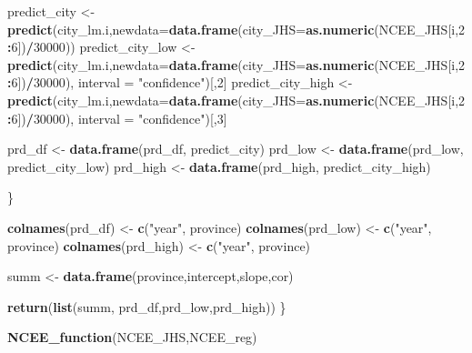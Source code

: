 \documentclass[]{article}
\newenvironment{Shaded}{\begin{snugshade}}{\end{snugshade}}
\newcommand{\KeywordTok}[1]{\textcolor[rgb]{0.13,0.29,0.53}{\textbf{#1}}}
\newcommand{\DataTypeTok}[1]{\textcolor[rgb]{0.13,0.29,0.53}{#1}}
\newcommand{\DecValTok}[1]{\textcolor[rgb]{0.00,0.00,0.81}{#1}}
\newcommand{\StringTok}[1]{\textcolor[rgb]{0.31,0.60,0.02}{#1}}
\newcommand{\OperatorTok}[1]{\textcolor[rgb]{0.81,0.36,0.00}{\textbf{#1}}}
\newcommand{\NormalTok}[1]{#1}
\begin{document}
\begin{Shaded}
\begin{Highlighting}[]
\NormalTok{    predict_city <-}\KeywordTok{predict}\NormalTok{(city_lm.i,}\DataTypeTok{newdata=}\KeywordTok{data.frame}\NormalTok{(}\DataTypeTok{city_JHS=}\KeywordTok{as.numeric}\NormalTok{(NCEE_JHS[i,}\DecValTok{2}\OperatorTok{:}\DecValTok{6}\NormalTok{])}\OperatorTok{/}\DecValTok{30000}\NormalTok{))}
\NormalTok{    predict_city_low <-}\KeywordTok{predict}\NormalTok{(city_lm.i,}\DataTypeTok{newdata=}\KeywordTok{data.frame}\NormalTok{(}\DataTypeTok{city_JHS=}\KeywordTok{as.numeric}\NormalTok{(NCEE_JHS[i,}\DecValTok{2}\OperatorTok{:}\DecValTok{6}\NormalTok{])}\OperatorTok{/}\DecValTok{30000}\NormalTok{), }\DataTypeTok{interval =} \StringTok{"confidence"}\NormalTok{)[,}\DecValTok{2}\NormalTok{]}
\NormalTok{    predict_city_high <-}\KeywordTok{predict}\NormalTok{(city_lm.i,}\DataTypeTok{newdata=}\KeywordTok{data.frame}\NormalTok{(}\DataTypeTok{city_JHS=}\KeywordTok{as.numeric}\NormalTok{(NCEE_JHS[i,}\DecValTok{2}\OperatorTok{:}\DecValTok{6}\NormalTok{])}\OperatorTok{/}\DecValTok{30000}\NormalTok{), }\DataTypeTok{interval =} \StringTok{"confidence"}\NormalTok{)[,}\DecValTok{3}\NormalTok{]}
    
\NormalTok{    prd_df <-}\StringTok{ }\KeywordTok{data.frame}\NormalTok{(prd_df, predict_city)}
\NormalTok{    prd_low <-}\StringTok{ }\KeywordTok{data.frame}\NormalTok{(prd_low, predict_city_low)}
\NormalTok{    prd_high <-}\StringTok{ }\KeywordTok{data.frame}\NormalTok{(prd_high, predict_city_high)}
    
\NormalTok{  \}}
  
  \KeywordTok{colnames}\NormalTok{(prd_df) <-}\StringTok{ }\KeywordTok{c}\NormalTok{(}\StringTok{"year"}\NormalTok{, province)}
  \KeywordTok{colnames}\NormalTok{(prd_low) <-}\StringTok{ }\KeywordTok{c}\NormalTok{(}\StringTok{"year"}\NormalTok{, province)}
  \KeywordTok{colnames}\NormalTok{(prd_high) <-}\StringTok{ }\KeywordTok{c}\NormalTok{(}\StringTok{"year"}\NormalTok{, province)}
  
\NormalTok{  summ <-}\StringTok{ }\KeywordTok{data.frame}\NormalTok{(province,intercept,slope,cor)}
  
  \KeywordTok{return}\NormalTok{(}\KeywordTok{list}\NormalTok{(summ, prd_df,prd_low,prd_high))}
\NormalTok{\}}

\KeywordTok{NCEE_function}\NormalTok{(NCEE_JHS,NCEE_reg)}
\end{Highlighting}
\end{Shaded}
\end{document}
